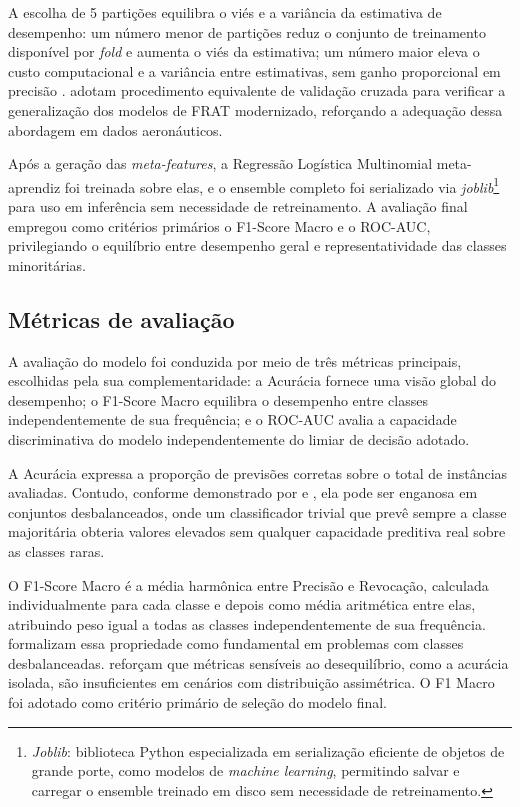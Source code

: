 \documentclass[english,brazilian]{UNISINOSartigo}
\begin{document}
A escolha de 5 partições equilibra o viés e a variância da estimativa de
desempenho: um número menor de partições reduz o conjunto de treinamento
disponível por \textit{fold} e aumenta o viés da estimativa; um número maior
eleva o custo computacional e a variância entre estimativas, sem ganho
proporcional em precisão \cite{HASTIE2009,GERON2019}. 
adotam procedimento equivalente de validação cruzada para verificar a
generalização dos modelos de FRAT modernizado, reforçando a adequação dessa
abordagem em dados aeronáuticos.

Após a geração das \textit{meta-features}, a Regressão Logística Multinomial
meta-aprendiz foi treinada sobre elas, e o ensemble completo foi serializado via
\textit{joblib}\footnote{\textit{Joblib}: biblioteca Python especializada em
serialização eficiente de objetos de grande porte, como modelos de
\textit{machine learning}, permitindo salvar e carregar o ensemble treinado
em disco sem necessidade de retreinamento.} para uso em inferência sem
necessidade de retreinamento. A
avaliação final empregou como critérios primários o F1-Score Macro e o ROC-AUC,
privilegiando o equilíbrio entre desempenho geral e representatividade das
classes minoritárias.

\subsection{Métricas de avaliação}

A avaliação do modelo foi conduzida por meio de três métricas principais,
escolhidas pela sua complementaridade: a Acurácia fornece uma visão global do
desempenho; o F1-Score Macro equilibra o desempenho entre classes
independentemente de sua frequência; e o ROC-AUC avalia a capacidade
discriminativa do modelo independentemente do limiar de decisão adotado.

A Acurácia expressa a proporção de previsões corretas sobre o total de
instâncias avaliadas. Contudo, conforme demonstrado por  e
, ela pode ser enganosa em conjuntos desbalanceados,
onde um classificador trivial que prevê sempre a classe majoritária obteria
valores elevados sem qualquer capacidade preditiva real sobre as classes raras.

O F1-Score Macro é a média harmônica entre Precisão e Revocação,
calculada individualmente para cada classe e depois como média aritmética entre
elas, atribuindo peso igual a todas as classes independentemente de sua
frequência.  formalizam essa propriedade como
fundamental em problemas com classes desbalanceadas. 
reforçam que métricas sensíveis ao desequilíbrio, como a acurácia isolada, são
insuficientes em cenários com distribuição assimétrica. O F1 Macro foi adotado
como critério primário de seleção do modelo final.
\end{document}
